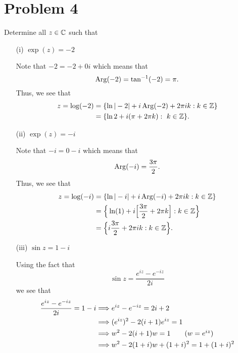 \documentclass[a4paper]{article}
\begin{document}
\section*{Problem 4}
Determine all \( z \in \mathbb{C}  \) such that 
\begin{enumerate}
    \item[(i)] \( \exp(z) = -2 \)
        \begin{solution}
        Note that \( -2 = -2 + 0i \) which means that 
        \[  \operatorname{Arg}(-2) = \tan^{-1}(-2) = \pi. \]
        Thus, we see that 
        \begin{align*}
            z = \log(-2) &= \{  \ln | -2 |  + i \operatorname{Arg}(-2) + 2 \pi i k : k \in \mathbb{Z}  \} \\
                         &= \{ \ln 2 + i ( \pi + 2\pi k) : \ k \in \mathbb{Z} \} . 
        \end{align*}
        \end{solution}
    \item[(ii)] \( \exp(z) = -i \)
        \begin{solution}
        Note that \( -i = 0 - i \) which means that 
        \[  \operatorname{Arg}(-i) = \frac{ 3 \pi }{ 2 }. \]
        Thus, we see that
        \begin{align*}
            z =  \log(-i) &= \{ \ln | -i |  + i \operatorname{Arg}(-i) + 2 \pi i k  : k \in \mathbb{Z}  \} \\
                          &=  \Big\{ \ln (1) + i \Big[\frac{ 3 \pi  }{  2  }  + 2 \pi k \Big] : k \in \mathbb{Z} \Big\} \\ 
                          &= \Big\{ i \frac{ 3 \pi  }{  2  }  + 2 \pi i k : k \in \mathbb{Z}  \Big\}. 
        \end{align*}
        \end{solution}
    \item[(iii)] \( \sin z = 1 - i \)
        \begin{solution}
        Using the fact that 
        \[  \sin z = \frac{ e^{iz} - e^{-iz} }{ 2i }  \]
        we see that
        \begin{align*}
            \frac{ e^{iz} - e^{-iz} }{ 2i  } = 1 - i &\Longrightarrow  e^{iz} - e^{-iz} = 2i + 2  \\
                                                     &\Longrightarrow (e^{iz})^{2} - 2(i+1) e^{iz} = 1 \\ 
                                                     &\Longrightarrow w^{2} - 2(i+1)w = 1  \tag{\( w = e^{iz} \)}\\
                                                     &\Longrightarrow w^{2} -2(1+i) w + (1+i)^{2} = 1 + (1+i)^{2} \\

\end{align*}
\end{solution}
\end{enumerate}
\end{document}
